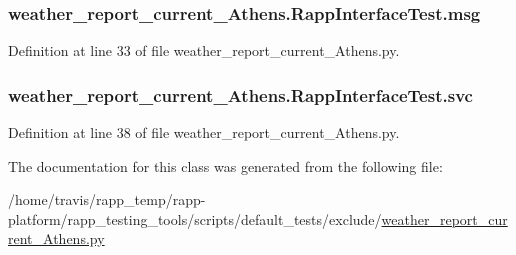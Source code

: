 \hypertarget{classweather__report__current__Athens_1_1RappInterfaceTest_ae08ebb20296ee87b61b151ed5dfc5a10}{
\subsubsection[{msg}]{\setlength{\rightskip}{0pt plus 5cm}weather\-\_\-report\-\_\-current\-\_\-\-Athens.\-Rapp\-Interface\-Test.\-msg}}\label{classweather__report__current__Athens_1_1RappInterfaceTest_ae08ebb20296ee87b61b151ed5dfc5a10}


Definition at line 33 of file weather\-\_\-report\-\_\-current\-\_\-\-Athens.\-py.

\hypertarget{classweather__report__current__Athens_1_1RappInterfaceTest_a8f4106a17382df2b4912d5845c2e570a}{
\subsubsection[{svc}]{\setlength{\rightskip}{0pt plus 5cm}weather\-\_\-report\-\_\-current\-\_\-\-Athens.\-Rapp\-Interface\-Test.\-svc}}\label{classweather__report__current__Athens_1_1RappInterfaceTest_a8f4106a17382df2b4912d5845c2e570a}


Definition at line 38 of file weather\-\_\-report\-\_\-current\-\_\-\-Athens.\-py.



The documentation for this class was generated from the following file\-:\begin{DoxyCompactItemize}
\item 
/home/travis/rapp\-\_\-temp/rapp-\/platform/rapp\-\_\-testing\-\_\-tools/scripts/default\-\_\-tests/exclude/\hyperlink{weather__report__current__Athens_8py}{weather\-\_\-report\-\_\-current\-\_\-\-Athens.\-py}\end{DoxyCompactItemize}
